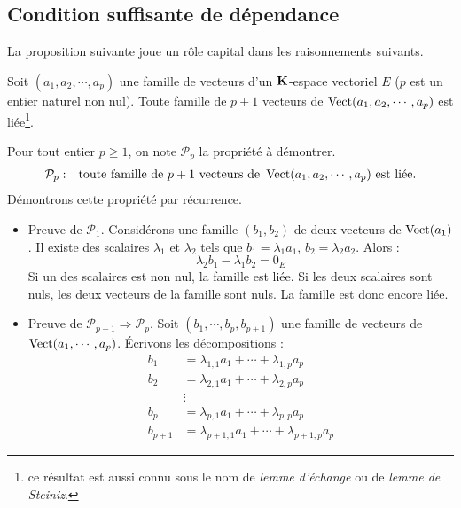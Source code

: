 \subsection{Condition suffisante de dépendance}
La proposition suivante joue un rôle capital dans les raisonnements suivants.  
\begin{propn} \label{csd}
 Soit $(a_1,a_2,\cdots,a_p)$ une famille de vecteurs d'un $\mathbf{K}$-espace vectoriel $E$ ($p$ est un entier naturel non nul). Toute famille de $p+1$ vecteurs de $\mathop{\mathrm{Vect}}(a_1,a_2,\cdots,a_p)$ est liée\footnote{ce résultat est aussi connu sous le nom de \emph{lemme d'échange} ou de \emph{lemme de Steiniz}.}.
\end{propn}
\begin{demo}
 Pour tout entier $p\geq1$, on note $\mathcal P_p$ la propriété à démontrer.
\begin{align*}
 \mathcal P_p &:& \text{toute famille de } p+1 \text{ vecteurs de } \mathop{\mathrm{Vect}}(a_1,a_2,\cdots,a_p) \text{ est liée.}
\end{align*}
Démontrons cette propriété par récurrence.
\begin{itemize}
 \item Preuve de $\mathcal P_1$.\newline
Considérons une famille $(b_1,b_2)$ de deux vecteurs de $\mathop{\mathrm{Vect}}(a_1)$. Il existe des scalaires $\lambda_1$ et $\lambda_2$ tels que $b_1=\lambda_1 a_1$, $b_2 = \lambda_2a_2$. Alors :
\begin{displaymath}
 \lambda_2 b_1 - \lambda_1 b_2 = 0_E
\end{displaymath}
Si un des scalaires est non nul, la famille est liée. Si les deux scalaires sont nuls, les deux vecteurs de la famille sont nuls. La famille est donc encore liée.
 \item Preuve de $\mathcal P_{p-1}\Rightarrow \mathcal P_{p}$.\newline
Soit $(b_1,\cdots,b_p,b_{p+1})$ une famille de vecteurs de $\mathop{\mathrm{Vect}}(a_1,\cdots,a_p)$. \'Ecrivons les décompositions :
\begin{align*}
 b_1 &= \lambda_{1,1}a_1 + \cdots + \lambda_{1,p}a_p \\
 b_2 &= \lambda_{2,1}a_1 + \cdots + \lambda_{2,p}a_p \\
     &\vdots\\
 b_p &= \lambda_{p,1}a_1 + \cdots + \lambda_{p,p}a_p \\
 b_{p+1} &= \lambda_{p+1,1}a_1 + \cdots + \lambda_{p+1,p}a_p
\end{align*}

\end{itemize}
\end{demo}
